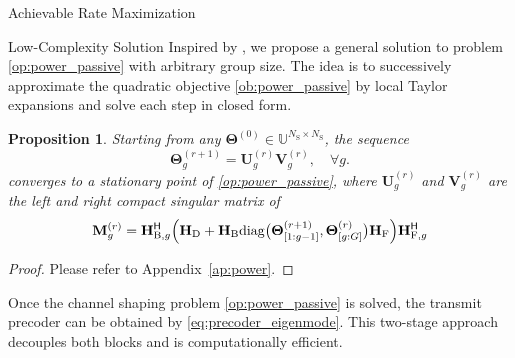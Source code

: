 \documentclass[journal]{IEEEtran}
\newtheorem{proposition}{Proposition}
\begin{document}
\begin{section}{Achievable Rate Maximization}
\begin{subsection}{Low-Complexity Solution}
		Inspired by \cite{Nie2017}, we propose a general solution to problem \eqref{op:power_passive} with arbitrary group size.
		The idea is to successively approximate the quadratic objective \eqref{ob:power_passive} by local Taylor expansions and solve each step in closed form.

		\begin{proposition}\label{pp:power}
			Starting from any $\mathbf{\Theta}^{(0)} \in \mathbb{U}^{N_\mathrm{S} \times N_\mathrm{S}}$, the sequence
			\begin{equation}
				\mathbf{\Theta}_g^{(r+1)} = \mathbf{U}_g^{(r)} \mathbf{V}_g^{(r)}, \quad \forall g.
				\label{eq:scattering_power}
			\end{equation}
			converges to a stationary point of \eqref{op:power_passive}, where $\mathbf{U}_g^{(r)}$ and $\mathbf{V}_g^{(r)}$ are the left and right compact singular matrix of
			\begin{equation}
				\mathbf{M}_g^{(r)} = \mathbf{H}_{\mathrm{B},g}^\mathsf{H} \Bigl(\mathbf{H}_\mathrm{D} + \mathbf{H}_\mathrm{B} \mathrm{diag}\bigl(\mathbf{\Theta}_{[1:g-1]}^{(r+1)},\mathbf{\Theta}_{[g:G]}^{(r)}\bigr) \mathbf{H}_\mathrm{F}\Bigr) \mathbf{H}_{\mathrm{F},g}^\mathsf{H}
				\label{eq:auxiliary_matrix_power}
			\end{equation}
		\end{proposition}

		\begin{proof}
			Please refer to Appendix~\ref{ap:power}.
		\end{proof}
		Once the channel shaping problem \eqref{op:power_passive} is solved, the transmit precoder can be obtained by \eqref{eq:precoder_eigenmode}.
		This two-stage approach decouples both blocks and is computationally efficient.
	\end{subsection}



\end{section}
\end{document}
